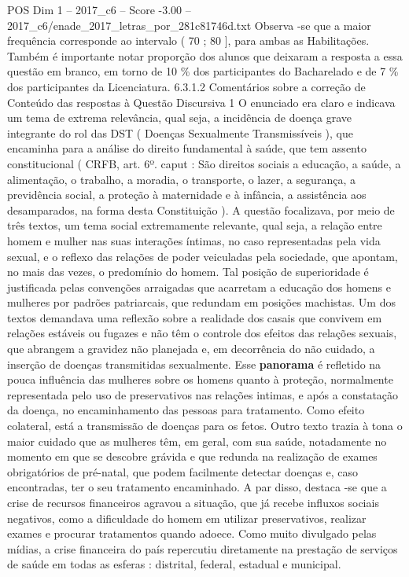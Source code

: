 \begin{textsample}{POS Dim 1 – 2017\_c6 – Score -3.00 – 2017\_c6/enade\_2017\_letras\_por\_281c81746d.txt}
Observa -se que a maior frequência corresponde ao intervalo ( 70 ; 80 ], para ambas as Habilitações.
Também é importante notar proporção dos alunos que deixaram a resposta a essa questão em branco, em torno de 10 \% dos participantes do Bacharelado e de 7 \% dos participantes da Licenciatura. 6.3.1.2 Comentários sobre a correção de Conteúdo das respostas à Questão Discursiva 1 O enunciado era claro e indicava um tema de extrema relevância, qual seja, a incidência de doença grave integrante do rol das DST ( Doenças Sexualmente Transmissíveis ), que encaminha para a análise do direito fundamental à saúde, que tem assento constitucional ( CRFB, art. 6º. caput : São direitos sociais a educação, a saúde, a alimentação, o trabalho, a moradia, o transporte, o lazer, a segurança, a previdência social, a proteção à maternidade e à infância, a assistência aos desamparados, na forma desta Constituição ).
A questão focalizava, por meio de três textos, um tema social extremamente relevante, qual seja, a relação entre homem e mulher nas suas interações íntimas, no caso representadas pela vida sexual, e o reflexo das relações de poder veiculadas pela sociedade, que apontam, no mais das vezes, o predomínio do homem.
Tal posição de superioridade é justificada pelas convenções arraigadas que acarretam a educação dos homens e mulheres por padrões patriarcais, que redundam em posições machistas.
Um dos textos demandava uma reflexão sobre a realidade dos casais que convivem em relações estáveis ou fugazes e não têm o controle dos efeitos das relações sexuais, que abrangem a gravidez não planejada e, em decorrência do não cuidado, a inserção de doenças transmitidas sexualmente.
Esse \textbf{panorama} é refletido na pouca influência das mulheres sobre os homens quanto à proteção, normalmente representada pelo uso de preservativos nas relações intimas, e após a constatação da doença, no encaminhamento das pessoas para tratamento.
Como efeito colateral, está a transmissão de doenças para os fetos.
Outro texto trazia à tona o maior cuidado que as mulheres têm, em geral, com sua saúde, notadamente no momento em que se descobre grávida e que redunda na realização de exames obrigatórios de pré-natal, que podem facilmente detectar doenças e, caso encontradas, ter o seu tratamento encaminhado.
A par disso, destaca -se que a crise de recursos financeiros agravou a situação, que já recebe influxos sociais negativos, como a dificuldade do homem em utilizar preservativos, realizar exames e procurar tratamentos quando adoece.
Como muito divulgado pelas mídias, a crise financeira do país repercutiu diretamente na prestação de serviços de saúde em todas as esferas : distrital, federal, estadual e municipal.

\end{textsample}

